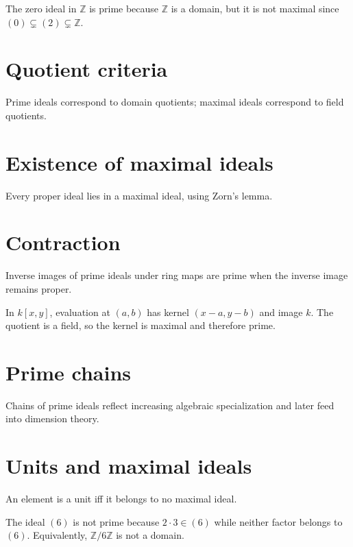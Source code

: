 \begin{example}\label{ex:v02-expand-01}
The zero ideal in $\mathbb Z$ is prime because $\mathbb Z$ is a domain, but it is not maximal since $(0)\subsetneq(2)\subsetneq\mathbb Z$.
\end{example}
\section{Quotient criteria}
Prime ideals correspond to domain quotients; maximal ideals correspond to field quotients.

\section{Existence of maximal ideals}
Every proper ideal lies in a maximal ideal, using Zorn's lemma.

\section{Contraction}
Inverse images of prime ideals under ring maps are prime when the inverse image remains proper.

\begin{example}\label{ex:v02-expand-02}
In $k[x,y]$, evaluation at $(a,b)$ has kernel $(x-a,y-b)$ and image $k$. The quotient is a field, so the kernel is maximal and therefore prime.
\end{example}
\section{Prime chains}
Chains of prime ideals reflect increasing algebraic specialization and later feed into dimension theory.

\section{Units and maximal ideals}
An element is a unit iff it belongs to no maximal ideal.

\begin{example}\label{ex:v02-expand-03}
The ideal $(6)$ is not prime because $2\cdot3\in(6)$ while neither factor belongs to $(6)$. Equivalently, $\mathbb Z/6\mathbb Z$ is not a domain.
\end{example}
